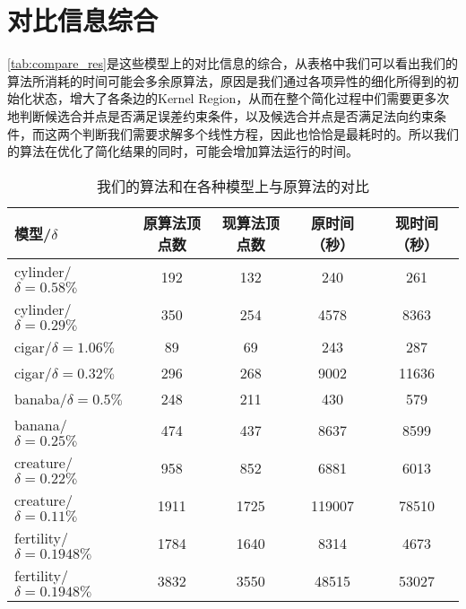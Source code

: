 \section{对比信息综合}
\autoref{tab:compare_res}是这些模型上的对比信息的综合，从表格中我们可以看出我们的算法所消耗的时间可能会多余原算法，原因是我们通过各项异性的细化所得到的初始化状态，增大了各条边的Kernel Region，从而在整个简化过程中们需要更多次地判断候选合并点是否满足误差约束条件，以及候选合并点是否满足法向约束条件，而这两个判断我们需要求解多个线性方程，因此也恰恰是最耗时的。所以我们的算法在优化了简化结果的同时，可能会增加算法运行的时间。
\begin{table}[htbp]
     \centering
     \caption{我们的算法和在各种模型上与原算法的对比}\label{tab:compare_res}
    \begin{tabu}{lcccc} %
    \toprule
    \textbf{模型/$\delta$}  & \textbf{原算法顶点数} & \textbf{现算法顶点数} & \textbf{原时间}（秒） & \textbf{现时间}（秒）\\
    \midrule
    cylinder/$\delta=0.58\%$     & 192  & 132 & 240 & 261 \\
    cylinder/$\delta=0.29\%$     & 350  & 254 & 4578 & 8363\\
    cigar/$\delta=1.06\%$        & 89 & 69 & 243 & 287 \\
    cigar/$\delta=0.32\%$        & 296 & 268 & 9002 & 11636  \\
    banaba/$\delta=0.5\%$        & 248 & 211 & 430 & 579 \\
    banana/$\delta=0.25\%$       & 474 & 437 & 8637 & 8599 \\
    creature/$\delta=0.22\%$     & 958 & 852 & 6881 & 6013 \\
    creature/$\delta=0.11\%$     & 1911 & 1725 & 119007 & 78510 \\
    fertility/$\delta=0.1948\%$     & 1784 & 1640 & 8314 & 4673 \\
    fertility/$\delta=0.1948\%$     & 3832 & 3550 & 48515 & 53027 \\
    \bottomrule
    \end{tabu}%
\end{table}
